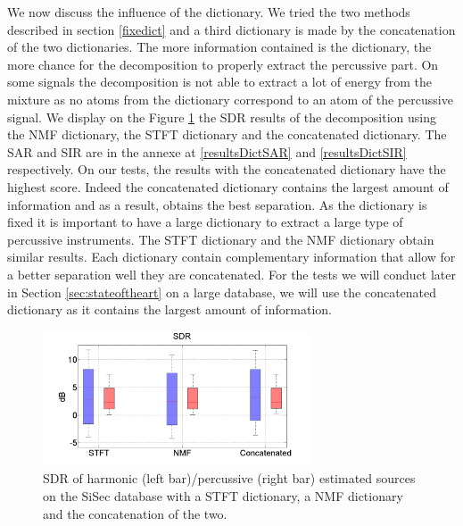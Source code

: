 \documentclass[journal]{IEEEtran}
\begin{document}
We now discuss the influence of the dictionary. We tried the two methods described in section \ref{fixedict} and a third dictionary is made by the concatenation of the two dictionaries. The more information contained is the dictionary, the more chance for the decomposition to properly extract the percussive part. On some signals the decomposition is not able to extract a lot of energy from the mixture as no atoms from the dictionary correspond to an atom of the percussive signal.
We display on the Figure \ref{resultsDict} the SDR results of the decomposition using the NMF dictionary, the STFT dictionary and the concatenated dictionary. The SAR and SIR are in the annexe at \ref{resultsDictSAR} and \ref{resultsDictSIR} respectively. On our tests, the results with the concatenated dictionary have the highest score. Indeed the concatenated dictionary contains the largest amount of information and as a result, obtains the best separation. As the dictionary is fixed it is important to have a large dictionary to extract a large type of percussive instruments. The STFT dictionary and the NMF dictionary obtain similar results. Each dictionary contain complementary information that allow for a better separation well they are concatenated. For the tests we will conduct later in Section \ref{sec:stateoftheart} on a large database, we will use the concatenated dictionary as it contains the largest amount of information. 


\begin{figure}[htb]

  \centering 
  \includegraphics[width=8cm]{fig/DictSDR.png}
  \caption{\label{resultsDict} SDR of harmonic (left bar)/percussive (right bar) estimated sources on the SiSec database with a STFT dictionary, a NMF dictionary and the concatenation of the two.}
  
\end{figure}
\end{document}

